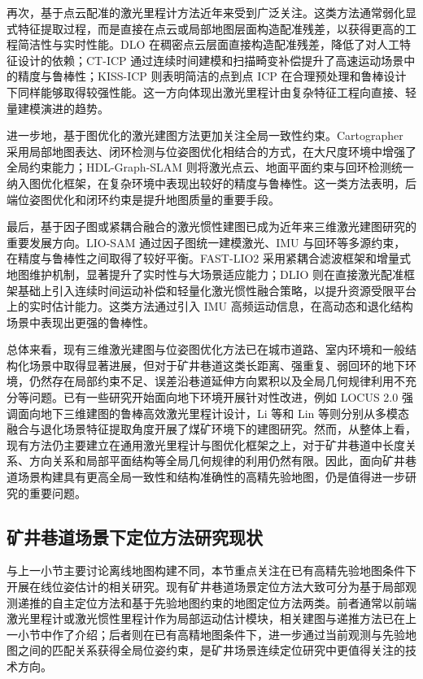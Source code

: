 再次，基于点云配准的激光里程计方法近年来受到广泛关注。这类方法通常弱化显式特征提取过程，而是直接在点云或局部地图层面构造配准残差，以获得更高的工程简洁性与实时性能。DLO 在稠密点云层面直接构造配准残差，降低了对人工特征设计的依赖\cite{Chen2021DLO}；CT-ICP 通过连续时间建模和扫描畸变补偿提升了高速运动场景中的精度与鲁棒性\cite{Dellenbach2021CTICP}；KISS-ICP 则表明简洁的点到点 ICP 在合理预处理和鲁棒设计下同样能够取得较强性能\cite{Vizzo2022KISSICP}。这一方向体现出激光里程计由复杂特征工程向直接、轻量建模演进的趋势。

进一步地，基于图优化的激光建图方法更加关注全局一致性约束。Cartographer 采用局部地图表达、闭环检测与位姿图优化相结合的方式，在大尺度环境中增强了全局约束能力\cite{Hess2016LoopClosure}；HDL-Graph-SLAM 则将激光点云、地面平面约束与回环检测统一纳入图优化框架，在复杂环境中表现出较好的精度与鲁棒性\cite{Koide2019HDLGraphSLAM}。这一类方法表明，后端位姿图优化和闭环约束是提升地图质量的重要手段。

最后，基于因子图或紧耦合融合的激光惯性建图已成为近年来三维激光建图研究的重要发展方向。LIO-SAM 通过因子图统一建模激光、IMU 与回环等多源约束，在精度与鲁棒性之间取得了较好平衡\cite{Shan2020LIOSAM}。FAST-LIO2 采用紧耦合滤波框架和增量式地图维护机制，显著提升了实时性与大场景适应能力\cite{Xu2021FASTLIO2}；DLIO 则在直接激光配准框架基础上引入连续时间运动补偿和轻量化激光惯性融合策略，以提升资源受限平台上的实时估计能力\cite{Kang2022DLIO}。这类方法通过引入 IMU 高频运动信息，在高动态和退化结构场景中表现出更强的鲁棒性。

总体来看，现有三维激光建图与位姿图优化方法已在城市道路、室内环境和一般结构化场景中取得显著进展，但对于矿井巷道这类长距离、强重复、弱回环的地下环境，仍然存在局部约束不足、误差沿巷道延伸方向累积以及全局几何规律利用不充分等问题。已有一些研究开始面向地下环境开展针对性改进，例如 LOCUS 2.0 强调面向地下三维建图的鲁棒高效激光里程计设计\cite{Palieri2022LOCUS}，Li 等和 Lin 等则分别从多模态融合与退化场景特征提取角度开展了煤矿环境下的建图研究\cite{Li_2023,Lin_2024}。然而，从整体上看，现有方法仍主要建立在通用激光里程计与图优化框架之上，对于矿井巷道中长度关系、方向关系和局部平面结构等全局几何规律的利用仍然有限。因此，面向矿井巷道场景构建具有更高全局一致性和结构准确性的高精先验地图，仍是值得进一步研究的重要问题。

\subsection{矿井巷道场景下定位方法研究现状}

与上一小节主要讨论离线地图构建不同，本节重点关注在已有高精先验地图条件下开展在线位姿估计的相关研究。现有矿井巷道场景定位方法大致可分为基于局部观测递推的自主定位方法和基于先验地图约束的地图定位方法两类。前者通常以前端激光里程计或激光惯性里程计作为局部运动估计模块，相关建图与递推方法已在上一小节中作了介绍；后者则在已有高精地图条件下，进一步通过当前观测与先验地图之间的匹配关系获得全局位姿约束，是矿井场景连续定位研究中更值得关注的技术方向\cite{Inostroza_2023,Liu_2025,Kucner2015NDTMCL,Chen2021RangeMCL,Koide2024RILocalization}。

